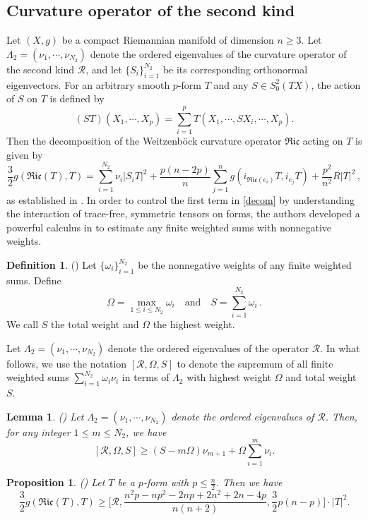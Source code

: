 \documentclass[12pt, twoside]{article}
\newtheorem{lemma}[theorem]{Lemma}
\newtheorem{proposition}[theorem]{Proposition}
\theoremstyle{definition}
\newtheorem{definition}[theorem]{Definition}
\numberwithin{equation}{section}
\def\Om{\Omega}
\begin{document}
\subsection{Curvature operator of the second kind}
Let $(X,g)$ be a compact Riemannian manifold of dimension $n\geq 3$. Let $\Lambda_{2}=(\nu_{1},\cdots,\nu_{N_2})$ denote the ordered eigenvalues of the curvature operator of the second kind $\mathcal{R}$, and let $\{S_{i}\}_{i=1}^{N_2}$ be its corresponding orthonormal eigenvectors. For an arbitrary smooth $p$-form $T$ and any $S\in S^{2}_{0}(TX)$, the action of $S$ on $T$ is defined by
$$(ST)(X_{1},\cdots,X_{p})=\sum_{i=1}^{p}T(X_{1},\cdots,SX_{i},\cdots,X_{p}).$$ 
Then the decomposition of the Weitzenb\"{o}ck curvature operator $\mathfrak{Ric}$ acting on $T$ is given by 
\begin{equation}\label{decom}
\frac{3}{2}g(\mathfrak{Ric}(T),T)=\sum_{i=1}^{N_{2}}\nu_{i}|S_{i}T|^{2}+\frac{p(n-2p)}{n}\sum_{j=1}^{n}g(i_{\mathfrak{Ric}(e_{i})}T,i_{e_{j}}T)+\frac{p^{2}}{n^2}R|T|^{2}\,,
\end{equation}
as established in \cite{NPW23,NPWW23}. 
In order to  control the first term in \eqref{decom} by understanding the interaction of trace-free, symmetric tensors on forms, the authors developed a powerful calculus in \cite{NPW23} to estimate any finite weighted sums  with nonnegative weights.
\begin{definition}(\cite[Definition 3.1]{NPW23})
Let $\{\omega_{i}\}_{i=1}^{N_2}$ be the nonnegative weights of any finite weighted sums. Define
\[
\Om=\max_{1\leq i\leq N_2}\omega_{i} \quad \mathrm{and} \quad  S=\sum_{i=1}^{N_2}\omega_{i}\,.
\]
We call $S$ the total weight and $\Om$ the highest weight.
\end{definition} 
Let $\Lambda_{2}=(\nu_{1},\cdots,\nu_{N_2})$ denote the ordered eigenvalues of the operator $\mathcal{R}$.  In what follows, we use the notation $[\mathcal{R},\Om,S]$ to denote the supremum of all finite weighted sums $\sum_{i=1}^{N_2}\omega_{i}\nu_{i}$  in terms of $\Lambda_2$ with highest weight $\Om$ and total weight $S$. %
\begin{lemma}\label{Lem 3.4}(\cite[Lemma 3.4]{NPW23})
Let $\Lambda_{2}=(\nu_{1},\cdots,\nu_{N_2})$ denote the ordered eigenvalues of $\mathcal{R}$. Then, for any integer $1\leq m\leq N_{2}$, we have
$$[\mathcal{R},\Om,S]\geq(S-m\Om)\nu_{m+1}+\Om\sum_{i=1}^{m}\nu_{i}.$$\end{lemma}
\begin{proposition}\label{Prop 3.15}(\cite[Proposition 3.15]{NPW23})
Let  $T$ be a $p$-form with $p\leq\frac{n}{2}$. Then we have
$$\frac{3}{2}g(\mathfrak{Ric}(T),T)\geq \Big[\mathcal{R},\frac{n^{2}p-np^{2}-2np+2n^{2}+2n-4p}{n(n+2)},\frac{3}{2}p(n-p) \Big]\cdot |T|^{2}.$$
\end{proposition}
\end{document}
